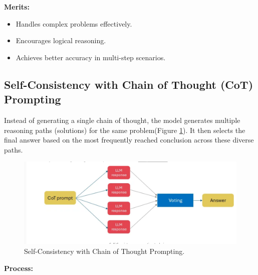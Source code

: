 \documentclass[12pt, a4paper]{article}
\begin{document}
\textbf{Merits:}
\begin{itemize}
    \item Handles complex problems effectively.
    \item Encourages logical reasoning.
    \item Achieves better accuracy in multi-step scenarios.
\end{itemize}
\subsection{Self-Consistency with Chain of Thought (CoT) Prompting}
Instead of generating a single chain of thought, the model generates multiple reasoning paths (solutions) for the same problem(Figure \ref{fig:SCOT-prompting}).
It then selects the final answer based on the most frequently reached conclusion across these diverse paths.
\begin{figure}[h]
    \centering
    \includegraphics[width=\textwidth,height=0.7\textwidth]{STOC.png}
    \caption{Self-Consistency with Chain of Thought Prompting.}
    \label{fig:SCOT-prompting}
\end{figure}

\textbf{Process:}
\end{document}
